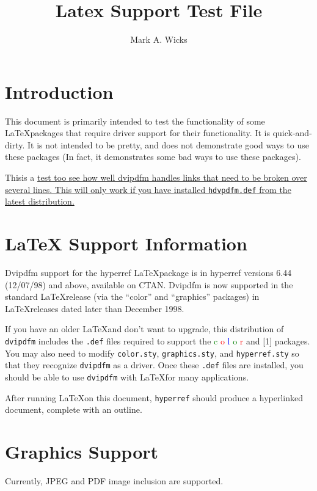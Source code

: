 \documentclass[dvipdfm]{article}
\title{\color{blue}Latex Support Test File}
\author{\color{green}Mark A. Wicks}
\begin{document}
\maketitle
\section{Introduction}
This document is primarily intended
to test the functionality
of some \LaTeX\space packages that require
driver support for their functionality.
It is quick-and-dirty.
It is not intended to be pretty, and
does not demonstrate good ways to use these packages
(In fact, it demonstrates some bad ways to use these packages).

Thisis a \href{http://odo.kettering.edu/dvipdfm/}{test too see how
well dvipdfm handles links that need to be broken over several lines.  This
will only work if you have installed {\tt hdvpdfm.def} from the latest
distribution.}

\section{LaTeX Support Information}
Dvipdfm support for the hyperref \LaTeX\space package is 
in hyperref versions 6.44 (12/07/98) and above, available on CTAN.
Dvipdfm is now supported in the
standard \LaTeX\space release (via the ``color'' and ``graphics'' packages) in
\LaTeX\space releases dated later than December 1998.

If you have an older LaTeX\space and don't want to upgrade,
this distribution of {\tt dvipdfm} includes
the {\tt .def} files required to support
the
{\textcolor{green}{c}%
\textcolor{red}{o}%
\textcolor{blue}{l}%
\textcolor{green}{o}%
\textcolor{red}{r}
and
\scalebox{1.3}[1]{}
packages.}
You may also need to modify {\tt color.sty}, {\tt graphics.sty},
and {\tt hyperref.sty} so that they
recognize {\tt dvipdfm} as a driver.
Once these {\tt .def} files are installed,
you should be able to use {\tt dvipdfm}
with \LaTeX\space for many applications.

After running \LaTeX\space on this
document, {\tt hyperref}
should produce a hyperlinked
document, complete with an outline.

\newpage
\section{Graphics Support}
Currently, JPEG and PDF image
inclusion are supported.
\end{document}
